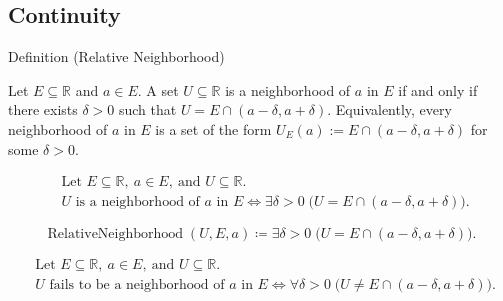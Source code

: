 
\subsection*{Continuity}
\label{sec:continuity}


\begin{definitionbox}{Definition (Relative Neighborhood)}
\begin{definition}
\label{def:relative-neighborhood}
Let $E \subseteq \mathbb{R}$ and $a \in E$. A set $U \subseteq \mathbb{R}$ is a neighborhood of $a$ in $E$ if and only if there exists $\delta > 0$ such that $U = E \cap (a-\delta, a+\delta)$. Equivalently, every neighborhood of $a$ in $E$ is a set of the form $U_E(a) := E \cap (a-\delta, a+\delta)$ for some $\delta > 0$.
\end{definition}
\end{definitionbox}

\begin{remark*}
\[
\begin{aligned}
&\text{Let } E \subseteq \mathbb{R},\ a \in E,\ \text{and } U \subseteq \mathbb{R}.\\
&U \text{ is a neighborhood of } a \text{ in } E
\Longleftrightarrow
\exists \delta > 0\; \bigl(U = E \cap (a-\delta, a+\delta)\bigr).
\end{aligned}
\]
\end{remark*}

\begin{remark*}
\[
\operatorname{RelativeNeighborhood}(U,E,a)
\coloneqq
\exists \delta > 0\;
\bigl(U = E \cap (a-\delta, a+\delta)\bigr).
\]
\end{remark*}

\begin{remark*}
\[
\begin{aligned}
&\text{Let } E \subseteq \mathbb{R},\ a \in E,\ \text{and } U \subseteq \mathbb{R}.\\
&U \text{ fails to be a neighborhood of } a \text{ in } E
\Longleftrightarrow
\forall \delta > 0\; \bigl(U \ne E \cap (a-\delta, a+\delta)\bigr).
\end{aligned}
\]
\end{remark*}

